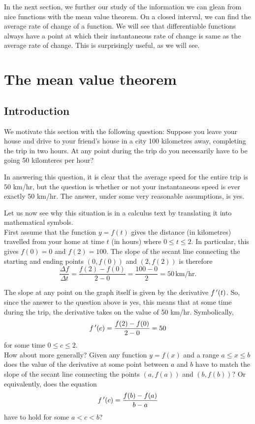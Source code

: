 In the next section, we further our study of the information we can glean from nice functions with the mean value theorem. On a closed interval, we can find the average rate of change of a function. We will see that differentiable functions always have a point at which their instantaneous rate of change is same as the average rate of change. This is surprisingly useful, as we will see.


\section{The mean value theorem}\label{sec:mvt}
\subsection{Introduction}
We motivate this section with the following question: Suppose you leave your house and drive to your friend's house in a city 100 kilometres away, completing the trip in two hours.  At any point during the trip do you necessarily have to be going 50 kilomteres per hour?

In answering this question, it is clear that the average speed for the entire trip is 50 km/hr, but the question is whether or not your instantaneous speed is ever exactly 50 km/hr.  The answer, under some very reasonable assumptions, is yes.

Let us now see why this situation is in a calculus text by translating it into mathematical symbols.\\

First assume that the function $y = f(t)$ gives the distance (in kilometres) travelled from your home at time $t$ (in hours) where $0\le t\le 2$.  In particular, this gives $f(0)=0$ and $f(2)=100$.  The slope of the secant line connecting the starting and ending points $(0,f(0))$ and $(2,f(2))$ is therefore 
$$
\frac{\Delta f}{\Delta t} = \frac{f(2)-f(0)}{2-0} = \frac{100-0}{2} = 50 \, \text{km/hr}.
$$

The slope at any point on the graph itself is given by the derivative $f\,'(t)$.  So, since the answer to the question above is yes, this means that at some time during the trip, the derivative takes on the value of 50 km/hr.  Symbolically, 
$$
f\,'(c) = \frac{f(2)-f(0)}{2-0} = 50
$$
for some time $0\le c \le 2.$\\

How about more generally?  Given any function $y=f(x)$ and a range $a\le x\le b$ does the value of the derivative at some point between $a$ and $b$ have to match the slope of the secant line connecting the points $(a,f(a))$ and $(b,f(b))$?  Or equivalently, does the equation 
$$f\,'(c) = \frac{f(b)-f(a)}{b-a}$$
have to hold for some $a < c < b$?


